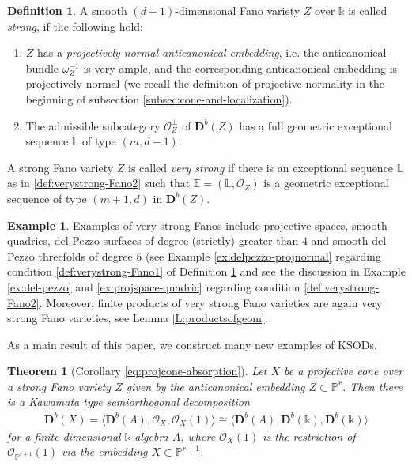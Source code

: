 \documentclass[a4paper,11pt, reqno]{amsart}
\def\E{\mathbb E}
\def\L{\mathbb L}
\def\P{\mathbb P}
\def\DD{\mathbf D}
\def\OO{\mathcal O}
\def\Db{\DD^b}
\theoremstyle{plain}
\newtheorem{theorem}[dummy]{Theorem}
\theoremstyle{definition}
\newtheorem{example}[dummy]{Example}
\newtheorem{definition}[dummy]{Definition}
\numberwithin{equation}{section}
\begin{document}
\begin{definition}\label{def:verystrong-Fano}
A smooth $(d-1)$-dimensional Fano variety $Z$ over $\mathbb{k}$ is called \emph{strong}, if the following hold: 
\begin{enumerate}
    \item\label{def:verystrong-Fano1} $Z$ has a \emph{projectively normal anticanonical embedding},
    i.e. the anticanonical bundle $\omega_Z^{-1}$ is very ample, and the corresponding anticanonical embedding is projectively normal  (we recall the definition of projective normality in the beginning of subsection \ref{subsec:cone-and-localization}). 
    \item\label{def:verystrong-Fano2} The admissible subcategory $\mathcal{O}_Z^\perp$ of $\Db(Z)$ has a full geometric exceptional sequence $\L$ of type $(m, d-1)$.
\end{enumerate}
A strong Fano variety $Z$ is called \emph{very strong} if there is an exceptional sequence $\L$ as in \eqref{def:verystrong-Fano2} such that  $\E=( \mathbb{L} , \OO_Z )$ is a geometric exceptional sequence of type $(m+1 , d)$ in $\Db(Z)$.
\end{definition}



\begin{example}\label{ex:intro-projcones}
Examples of very strong Fanos include projective spaces, smooth quadrics, del Pezzo surfaces of degree (strictly) greater than $4$ and smooth del Pezzo threefolds of degree $5$ (see Example \ref{ex:delpezzo-projnormal} regarding condition \eqref{def:verystrong-Fano1} of Definition \ref{def:verystrong-Fano} and see the discussion in Example \ref{ex:del-pezzo} and \ref{ex:projspace-quadric} regarding condition \eqref{def:verystrong-Fano2}.
Moreover, finite products of very strong Fano varieties are again very strong Fano varieties, 
see  Lemma \ref{L:productsofgeom}.
\end{example}

As a main result of  this paper, we construct many new examples of KSODs.

\begin{theorem}[Corollary \ref{eq:projcone-absorption}]\label{C:ProjCone}
Let $X$ be a projective cone over a  strong Fano variety $Z$ given by the anticanonical embedding $Z \subset \P^r$. 
Then 
there is a Kawamata type semiorthogonal decomposition 
\begin{align}
\Db(X)=\langle \Db(A), \mathcal{O}_X , \mathcal{O}_X (1) \rangle \cong \langle\Db(A), \Db(\mathbb{k}), \Db(\mathbb{k}) \rangle
\end{align}
for a finite dimensional $\mathbb{k}$-algebra $A$,
where $\OO_X (1)$ is the restriction of $\OO_{\P^{r+1}} (1)$ via the embedding $X \subset \P^{r+1}$.
\end{theorem}
\end{document}
